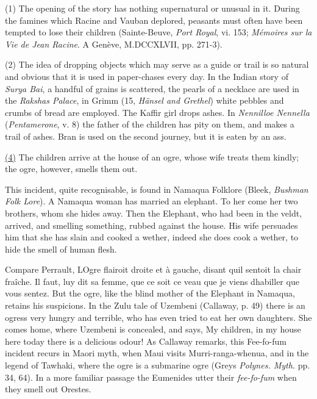 \documentclass[14pt,a4paper]{memoir}
\newcommand{\ul}[1]{\uline{#1}}
\begin{document}
{(1) The opening of the story has nothing supernatural or unusual in it.
During the famines which Racine and Vauban deplored, peasants must often
have been tempted to \textquotesingle lose\textquotesingle{} their
children (Sainte-Beuve, \emph{Port Royal}, vi. 153; \emph{Mémoires sur
la Vie de Jean Racine}. A Genève, M.DCCXLVII, pp. 271-3).

(2) The idea of dropping objects which may serve as a guide or
\textquotesingle trail\textquotesingle{} is so natural and obvious that
it is used in \textquotesingle paper-chases\textquotesingle{} every day.
In the Indian
story
of \emph{Surya Bai}, a handful of grains is scattered, the pearls of a
necklace are used in the \emph{Raksha\textquotesingle s Palace}, in
Grimm (15, \emph{Hänsel and Grethel}) white pebbles and crumbs of bread
are employed. The Kaffir girl drops
ashes.
In \emph{Nennilloe Nennella} (\emph{Pentamerone}, v. 8) the father of
the children has pity on them, and makes a trail of ashes. Bran is used
on the second journey, but it is eaten by an
ass.

\ul{(4)} The children arrive at the house of an ogre, whose wife treats
them kindly; the ogre, however, smells them out.

This incident, quite recognisable, is found in Namaqua Folklore (Bleek,
\emph{Bushman Folk Lore}). A Namaqua woman has married an elephant. To
her come her two brothers, whom she hides away. \textquotesingle Then
the Elephant, who had been in the veldt, arrived, and smelling
something, rubbed against the house.\textquotesingle{} His wife
persuades him that she has slain and cooked a wether, indeed she does
cook a wether, to hide the smell of human flesh.

Compare Perrault, \textquotesingle L\textquotesingle Ogre flairoit
droite et à gauche, disant qu\textquotesingle il sentoit la chair
fraîche. Il faut, luy dit sa femme, que ce soit ce veau que je viens
d\textquotesingle habiller que vous sentez.\textquotesingle{} But the
ogre, like the blind mother of the Elephant in Namaqua, retains his
suspicions. In the Zulu tale of Uzembeni (Callaway, p. 49) there is an
ogress very hungry and terrible, who has even tried to eat her own
daughters. She comes home, where Uzembeni is concealed, and says,
\textquotesingle My children, in my house here today there is a
delicious odour!\textquotesingle{} As Callaway remarks, this
\textquotesingle Fee-fo-fum\textquotesingle{} incident recurs in Maori
myth, when Maui visits Murri-ranga-whenua, and in the legend of Tawhaki,
where the ogre is a submarine ogre (Grey\textquotesingle s
\emph{Polynes. Myth.} pp. 34, 64). In a more familiar passage the
Eumenides utter their \emph{fee-fo-fum} when they smell out
Orestes.

}
\end{document}
